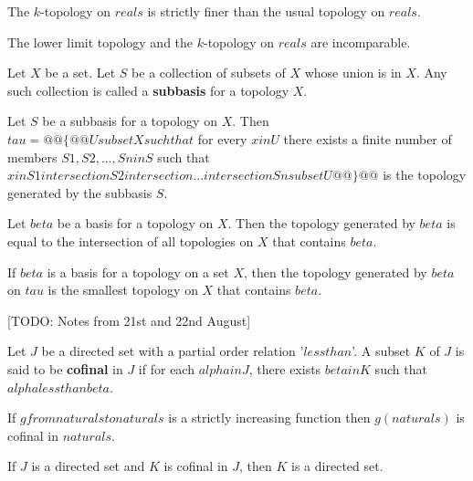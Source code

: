 \begin{prop}
    The $k$-topology on $reals$ is strictly finer than the usual topology on $reals$.
\end{prop}

\begin{prop}
    The lower limit topology and the $k$-topology on $reals$ are incomparable.
\end{prop}


\begin{defn}
    Let $X$ be a set. Let $S$ be a collection of subsets of $X$ whose union is in $X$. Any such collection is called a \textbf{subbasis} for a topology $X$.
\end{defn}

\begin{thm}
    Let $S$ be a subbasis for a topology on $X$. Then
    \\ $tau = @@\{@@ U subset X such that $ for every $ x in U $ there exists a finite number of members $ S1, S2, ..., Sn in S $ such that $ x in S1 intersection S2 intersection ... intersection Sn subset U @@\}@@$ is the topology generated by the subbasis $S$.
\end{thm}

\begin{thm}
    Let $beta$ be a basis for a topology on $X$. Then the topology generated by $beta$ is equal to the intersection of all topologies on $X$ that contains $beta$.
\end{thm}

\begin{thm}
    If $beta$ is a basis for a topology on a set $X$, then the topology generated by $beta$ on $tau$ is the smallest topology on $X$ that contains $beta$.
\end{thm}

[TODO: Notes from 21st and 22nd August]

\begin{defn}
    Let $J$ be a directed set with a partial order relation '$less than$'. A subset $K$ of $J$ is said to be \textbf{cofinal} in $J$ if for each $alpha in J$, there exists $beta in K$ such that $alpha less than beta$.
\end{defn}

\begin{prop}
    If $g from naturals to naturals$ is a strictly increasing function then $g(naturals)$ is cofinal in $naturals$.
\end{prop}

\begin{thm}
    If $J$ is a directed set and $K$ is cofinal in $J$, then $K$ is a directed set.
\end{thm}

